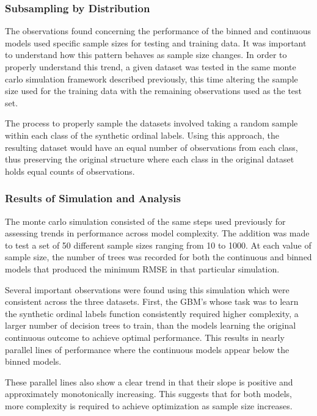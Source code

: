 \documentclass[10pt]{article}\usepackage[]{graphicx}\usepackage[]{xcolor}
\begin{document}
\subsubsection{Subsampling by Distribution}
The observations found concerning the performance of the binned and continuous models used specific sample sizes for testing and training data. It was important to understand how this pattern behaves as sample size changes. In order to properly understand this trend, a given dataset was tested in the same monte carlo simulation framework described previously, this time altering the sample size used for the training data with the remaining observations used as the test set. 

The process to properly sample the datasets involved taking a random sample within each class of the synthetic ordinal labels. Using this approach, the resulting dataset would have an equal number of observations from each class, thus preserving the original structure where each class in the original dataset holds equal counts of observations.


\subsubsection{Results of Simulation and Analysis}
The monte carlo simulation consisted of the same steps used previously for assessing trends in performance across model complexity. The addition was made to test a set of 50 different sample sizes ranging from 10 to 1000. At each value of sample size, the number of trees was recorded for both the continuous and binned models that produced the minimum RMSE in that particular simulation.

Several important observations were found using this simulation which were consistent across the three datasets. First, the GBM's whose task was to learn the synthetic ordinal labels function consistently required higher complexity, a larger number of decision trees to train, than the models learning the original continuous outcome to achieve optimal performance. This results in nearly parallel lines of performance where the continuous models appear below the binned models.

These parallel lines also show a clear trend in that their slope is positive and approximately monotonically increasing. This suggests that for both models, more complexity is required to achieve optimization as sample size increases. 
\end{document}
